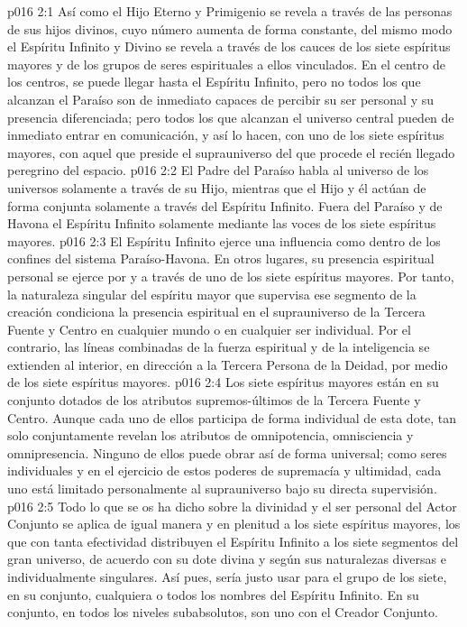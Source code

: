 \vs p016 2:1 Así como el Hijo Eterno y Primigenio se revela a través de las personas de sus hijos divinos, cuyo número aumenta de forma constante, del mismo modo el Espíritu Infinito y Divino se revela a través de los cauces de los siete espíritus mayores y de los grupos de seres espirituales a ellos vinculados. En el centro de los centros, se puede llegar hasta el Espíritu Infinito, pero no todos los que alcanzan el Paraíso son de inmediato capaces de percibir su ser personal y su presencia diferenciada; pero todos los que alcanzan el universo central pueden de inmediato entrar en comunicación, y así lo hacen, con uno de los siete espíritus mayores, con aquel que preside el suprauniverso del que procede el recién llegado peregrino del espacio.
\vs p016 2:2 El Padre del Paraíso habla al universo de los universos solamente a través de su Hijo, mientras que el Hijo y él actúan de forma conjunta solamente a través del Espíritu Infinito. Fuera del Paraíso y de Havona el Espíritu Infinito  solamente mediante las voces de los siete espíritus mayores.
\vs p016 2:3 \pc El Espíritu Infinito ejerce una influencia como  dentro de los confines del sistema Paraíso\hyp{}Havona. En otros lugares, su presencia espiritual personal se ejerce por y a través de uno de los siete espíritus mayores. Por tanto, la naturaleza singular del espíritu mayor que supervisa ese segmento de la creación condiciona la presencia espiritual en el suprauniverso de la Tercera Fuente y Centro en cualquier mundo o en cualquier ser individual. Por el contrario, las líneas combinadas de la fuerza espiritual y de la inteligencia se extienden al interior, en dirección a la Tercera Persona de la Deidad, por medio de los siete espíritus mayores.
\vs p016 2:4 \pc Los siete espíritus mayores están en su conjunto dotados de los atributos supremos\hyp{}últimos de la Tercera Fuente y Centro. Aunque cada uno de ellos participa de forma individual de esta dote, tan solo conjuntamente revelan los atributos de omnipotencia, omnisciencia y omnipresencia. Ninguno de ellos puede obrar así de forma universal; como seres individuales y en el ejercicio de estos poderes de supremacía y ultimidad, cada uno está limitado personalmente al suprauniverso bajo su directa supervisión.
\vs p016 2:5 Todo lo que se os ha dicho sobre la divinidad y el ser personal del Actor Conjunto se aplica de igual manera y en plenitud a los siete espíritus mayores, los que con tanta efectividad distribuyen el Espíritu Infinito a los siete segmentos del gran universo, de acuerdo con su dote divina y según sus naturalezas diversas e individualmente singulares. Así pues, sería justo usar para el grupo de los siete, en su conjunto, cualquiera o todos los nombres del Espíritu Infinito. En su conjunto, en todos los niveles subabsolutos, son uno con el Creador Conjunto.
